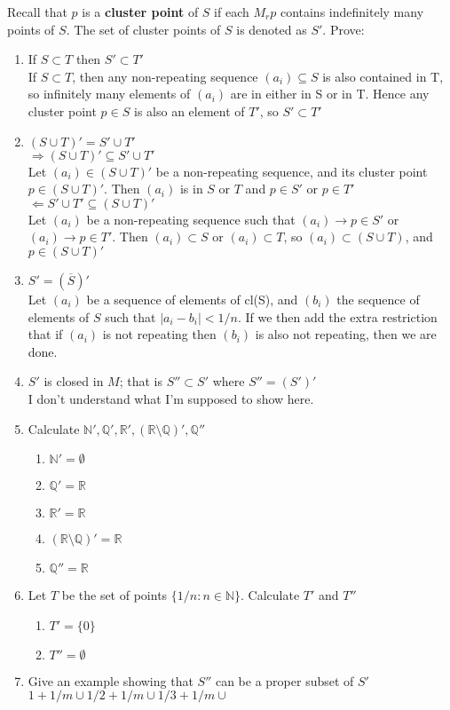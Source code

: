 \documentclass[12pt]{amsart}
\newcommand{\benu}{\begin{enumerate}}
\newcommand{\eenu}{\end{enumerate}}
\theoremstyle{definition}
\newcommand{\mbR}{\mathbb{R}}
\newcommand{\mbN}{\mathbb{N}}
\newcommand{\mbQ}{\mathbb{Q}}
\begin{document}
\begin{enumerate}[series=p]
Recall that $p$ is a \textbf{cluster point} of $S$ if each $M_rp$ contains indefinitely many points of $S$.  The set of cluster points of $S$ is denoted as $S'$.  Prove:
	\benu
		\item If $S \subset T$ then $S' \subset T'$\\
		If $S \subset T$, then any non-repeating sequence $(a_i) \subseteq S$ is also contained in T, so infinitely many elements of $(a_i)$ are in either in S or in T.  Hence any cluster point $p \in S$ is also an element of $T'$, so $S' \subset T'$
		\item $(S \cup T)' = S' \cup T'$\\
		$\Rightarrow  (S \cup T)' \subseteq S' \cup T'$\\
		Let $(a_i) \in (S \cup T)'$ be a non-repeating sequence, and its cluster point $p \in (S \cup T)'$.  Then $(a_i)$ is in $S$ or $T$ and $p \in S'$ or $p \in T'$\\
		$\Leftarrow  S' \cup T' \subseteq (S \cup T)'$\\
		Let $(a_i)$ be a non-repeating sequence such that $(a_i) \to p \in S'$ or $(a_i) \to p \in T'$.  Then $(a_i) \subset S$ or $(a_i) \subset T$, so $(a_i) \subset (S \cup T)$, and $p \in (S \cup T)'$
		\item $S' = (\overline{S})'$\\
		Let $(a_i)$ be a sequence of elements of cl(S), and $(b_i)$ the sequence of elements of $S$ such that $|a_i-b_i|<1/n$.  If we then add the extra restriction that if $(a_i)$ is not repeating then $(b_i)$ is also not repeating, then we are done.
		\item $S'$ is closed in $M$; that is $S'' \subset S'$ where $S'' = (S')'$\\
		I don't understand what I'm supposed to show here.
		\item Calculate $\mbN', \mbQ', \mbR', (\mbR \setminus \mbQ)', \mbQ''$
			\benu
				\item $\mbN' = \emptyset$
				\item $\mbQ' = \mbR$
				\item $\mbR' = \mbR$
				\item $(\mbR \setminus \mbQ)' = \mbR$
				\item $\mbQ'' = \mbR$
			\eenu
		\item Let $T$ be the set of points $\{1/n : n \in \mbN\}$.  Calculate $T'$ and $T''$
			\benu
				\item $T' = \{0\}$
				\item $T'' = \emptyset$
			\eenu
		\item Give an example showing that $S''$ can be a proper subset of $S'$\\
		${1+1/m}\cup {1/2+1/m}\cup {1/3+1/m}\cup$
	\eenu
\newpage


\end{enumerate}
\end{document}
